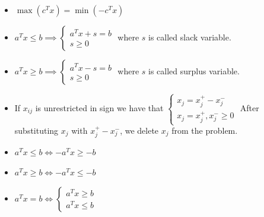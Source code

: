 \documentclass[12pt, a4paper]{report}
\begin{document}
    \begin{itemize}
        \item $\max{(c^Tx)}=\min{(-c^Tx)}$
        \item $a^Tx \leq b \implies \begin{cases}
            a^Tx+s=b \\
            s \geq 0
            \end{cases}$
            where $s$ is called slack variable. 
        \item $a^Tx \geq b \implies \begin{cases}
            a^Tx-s=b \\
            s \geq 0
            \end{cases}$
            where $s$ is called surplus variable. 
        \item If $x_{ij}$ is unrestricted in sign we have that $\begin{cases}
            x_j=x_j^{+}-x_j^{-} \\
            x_j=x_j^{+},x_j^{-} \geq 0
            \end{cases}$
            After substituting $x_j$ with $x_j^{+}-x_j^{-}$, we delete $x_j$ from the problem. 
        \item $a^Tx \leq b \Leftrightarrow -a^Tx \geq -b$
        \item $a^Tx \geq b \Leftrightarrow -a^Tx \leq -b$
        \item $a^Tx = b \Leftrightarrow \begin{cases}
            a^Tx \geq b \\
            a^Tx \leq b
        \end{cases}$
    \end{itemize}
\end{document}
